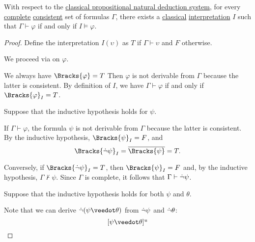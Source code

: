 \begin{proposition}\label{thm:consistent_implies_satisfiable}
  With respect to the \hyperref[def:propositional_natural_deduction_system]{classical propositional natural deduction system}, for every \hyperref[def:complete_set_of_sentences]{complete} \hyperref[def:consistent_set_of_sentences]{consistent} set of formulas \( \Gamma \), there exists a \hyperref[def:classical_semantics]{classical} \hyperref[def:propositional_valuation/interpretation]{interpretation} \( I \) such that \( \Gamma \vdash \varphi \) if and only if \( I \vDash \varphi \).
\end{proposition}
\begin{proof}
  Define the interpretation \( I(\upsilon) \) as \( T \) if \( \Gamma \vdash \upsilon \) and \( F \) otherwise.

  We proceed via  on \( \varphi \).

   We always have \( \Bracks{\varphi} = T \)
   Then \( \varphi \) is not derivable from \( \Gamma \) because the latter is consistent.
   By definition of \( I \), we have \( \Gamma \vdash \varphi \) if and only if \( \Bracks{\varphi}_I = T \).

   Suppose that the inductive hypothesis holds for \( \psi \).

  \SufficiencySubProof* If \( \Gamma \vdash \varphi \), the formula \( \psi \) is not derivable from \( \Gamma \) because the latter is consistent. By the inductive hypothesis, \( \Bracks{\psi}_I = F \), and
  \begin{equation*}
    \Bracks{\synneg \psi}_I = \oline{\Bracks{\psi}} = T.
  \end{equation*}

  \NecessitySubProof* Conversely, if \( \Bracks{\synneg \psi}_I = T \), then \( \Bracks{\psi}_I = F \) and, by the inductive hypothesis, \( \Gamma \not\vdash \psi \). Since \( \Gamma \) is complete, it follows that \( \Gamma \vdash \dot\neg \psi \).

   Suppose that the inductive hypothesis holds for both \( \psi \) and \( \theta \).

  Note that we can derive \( \synneg (\psi \synvee \theta) \) from \( \dot\neg \psi \) and \( \dot\neg \theta \):
  \begin{equation*}
    \begin{prooftree}
      \hypo{ [\psi \synvee \theta]^u }


\end{prooftree}
\end{equation*}
\end{proof}

